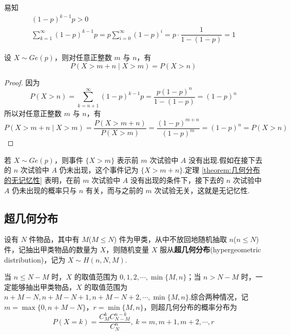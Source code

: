 易知
\begin{gather*}
    (1-p)^{k-1} p > 0 \\
    \sum_{k=1}^\infty (1-p)^{k-1} p = p \sum_{i=0}^\infty (1-p)^i = p \cdot \dfrac{1}{1-(1-p)} = 1    
\end{gather*}

\begin{theorem}
    \indent 设 $X \sim Ge(p)$，则对任意正整数 $m$ 与 $n$，有
    \begin{equation}
        P(X > m+n \mid X>m) = P(X>n)
    \end{equation}
\end{theorem}

\begin{proof}
    因为
    $$
    P(X>n) = \sum_{k=n+1}^{\infty} (1-p)^{k-1} p = \dfrac{p (1-p)^n}{1-(1-p)} = (1-p)^n
    $$
    所以对任意正整数 $m$ 与 $n$，有
    $$
    P(X > m+n \mid X>m) = \dfrac{P(X > m+n)}{P(X>m)} = \dfrac{(1-p)^{m+n}}{(1-p)^m} = (1-p)^n = P(X>n)
    $$

    \vspace{-2em}
\end{proof}

\begin{note}
    \indent 若 $X \sim Ge(p)$，则事件 $\{ X>m \}$ 表示前 $m$ 次试验中 $A$ 没有出现.假如在接下去的 $n$ 次试验中 $A$ 仍未出现，这个事件记为 $\{ X > m+n \}$.定理 \ref{theorem:几何分布的无记忆性} 表明，在前 $m$ 次试验中 $A$ 没有出现的条件下，接下去的 $n$ 次试验中 $A$ 仍未出现的概率只与 $n$ 有关，而与之前的 $m$ 次试验无关，这就是无记忆性.
\end{note}

\subsection{超几何分布}

设有 $N$ 件物品，其中有 $M$($M \leqslant N$) 件为甲类，从中不放回地随机抽取 $n$($n \leqslant N$) 件，记抽出甲类物品的数量为 $X$，则随机变量 $X$ 服从\textbf{超几何分布}(hypergeometric distribution)，记为 $X \sim H(n,N,M)$.

当 $n \leqslant N-M$ 时，$X$ 的取值范围为 $0,1,2,\cdots,\min\{ M,n \}$；当 $n > N-M$ 时，一定能够抽出甲类物品，$X$ 的取值范围为 $n+M-N, n+M-N+1, n+M-N+2, \cdots, \min\{ M,n \}$.综合两种情况，记 $m = \max\{ 0, n+M-N \}$，$r = \min\{ M,n \}$，则超几何分布的概率分布为
$$
P(X=k) = \dfrac{C_M^k C_{N-M}^{n-k}}{C_N^n},\ k=m, m+1, m+2, \cdots, r
$$

